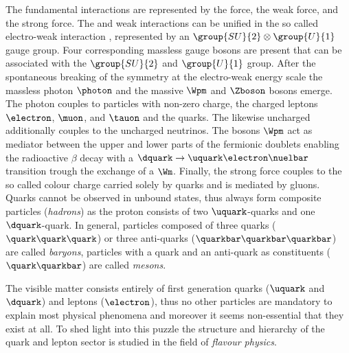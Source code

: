 The fundamental interactions are represented by the \EM force, the weak force,
and the strong force. The \EM and weak interactions can be unified in the so
called electro-weak interaction \cite{set:gws}, represented by an
$\group{SU}{2}\otimes\group{U}{1}$ gauge group. Four corresponding massless
gauge bosons are present that can be associated with the $\group{SU}{2}$ and
$\group{U}{1}$ group. After the spontaneous breaking of the symmetry at the
electro-weak energy scale the massless photon $\photon$ and the massive $\Wpm$
and $\Zboson$ bosons emerge. The photon couples to particles with non-zero \EM
charge, \ie the charged leptons $\electron$, $\muon$, and $\tauon$ and the
quarks. The likewise uncharged \Zboson additionally couples to the uncharged
neutrinos. The bosons $\Wpm$ act as mediator between the upper and lower parts
of the fermionic doublets enabling \eg the radioactive $\beta$ decay with a
$\dquark\to\uquark\electron\nuelbar$ transition trough the exchange of a $\Wm$.
Finally, the strong force couples to the so called colour charge carried solely
by quarks and is mediated by gluons. Quarks cannot be observed in unbound
states, thus always form composite particles (\emph{hadrons}) as \eg the proton
consists of two $\uquark$-quarks and one $\dquark$-quark. In general, particles
composed of three quarks ($\quark\quark\quark$) or three anti-quarks
($\quarkbar\quarkbar\quarkbar$) are called \emph{baryons}, particles with a
quark and an anti-quark as constituents ($\quark\quarkbar$) are called
\emph{mesons}.




The visible matter consists entirely of first generation quarks ($\uquark$ and
$\dquark$) and leptons ($\electron$), thus no other particles are mandatory to
explain most physical phenomena and moreover it seems non-essential that they
exist at all. To shed light into this puzzle the structure and hierarchy of the
quark and lepton sector is studied in the field of \emph{flavour physics}.
